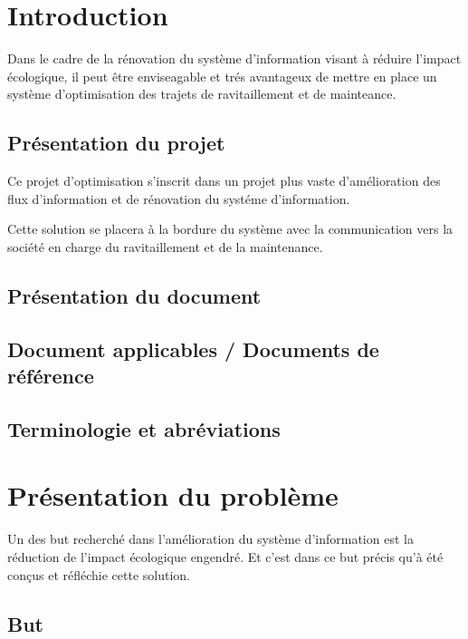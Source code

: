 \section{Introduction}

        Dans le cadre de la rénovation du système d'information visant à réduire l'impact écologique, il peut être enviseagable et trés avantageux de mettre en place un système d'optimisation des trajets de ravitaillement et de mainteance.

    \subsection{Présentation du projet}
    
        Ce projet d'optimisation s'inscrit dans un projet plus vaste d'amélioration des flux d'information et de rénovation du systéme d'information.
        
        Cette solution se placera à la bordure du système avec la communication vers la société en charge du ravitaillement et de la maintenance.
        
    \subsection{Présentation du document}
        
        
    \subsection{Document applicables / Documents de référence}
    
    \subsection{Terminologie et abréviations}
    
\section{Présentation du problème}
        
        Un des but recherché dans l'amélioration du système d'information est la réduction de l'impact écologique engendré. Et c'est dans ce but précis qu'à été conçus et réfléchie cette solution.
        
    \subsection{But}
    
